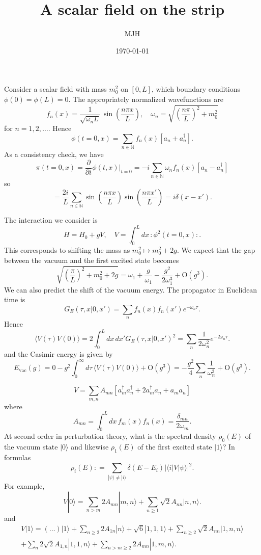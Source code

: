 \documentclass[10pt]{article}
\theoremstyle{plain}
\theoremstyle{remark}
\def\phd{{\phantom{\dagger}}}
\newcommand{\NO}[1]{{:\!#1\!:}}
\newcommand{\braket}[3]{\langle #1|#2|#3 \rangle}
\newcommand{\ket}[1]{|#1\rangle}
\newcommand{\expec}[1]{\langle #1 \rangle}
\def\ldef{\mathrel{\mathop:}=}
\def\beq{\begin{equation}}
\def\eeq{\end{equation}}
\def\mbb{\mathbb}
\def\pd{\partial}
\def\sO{\mathrm{O}}
\begin{document}
\title{A scalar field on the strip}
\author{MJH}
\date\today

\maketitle

Consider a scalar field with mass $m_0^2$ on $[0,L]$, which boundary conditions $\phi(0) = \phi(L) = 0$. The appropriately normalized wavefunctions are
\beq
f_n(x) = \frac{1}{\sqrt{ \omega_n L}} \, \sin\!\left(\frac{n\pi x}{L}\right)\!,
\quad
\omega_n = \sqrt{ \left( \frac{n \pi}{L} \right)^2 + m_0^2}
\eeq
for $n=1,2,\ldots$. Hence
\beq
\phi(t=0,x) = \sum_{n \in \mbb{N}} f_n(x) \left[ a_n^\phd + a_n^\dagger \right].
\eeq
As a consistency check, we have
\beq
\pi(t=0,x) = \frac{\pd}{\pd t} \phi(t,x) \Big|_{t=0} = - i  \sum_{n \in \mbb{N}} \omega_n f_n(x) \left[ a_n^\phd - a_n^\dagger \right]
\eeq
so
\beq
[\phi(0,x),\pi(0,x')] = \frac{2i}{L} \sum_{n \in \mbb{N}}  \sin\!\left(\frac{n \pi x}{L}\right)\sin\!\left(\frac{n \pi x'}{L}\right) = i \delta(x-x').
\eeq

The interaction we consider is
\beq
H = H_0 + g V,
\quad
V =  \int_0^L\!dx\, \NO{\phi^2(t=0,x)}.
\eeq
This corresponds to shifting the mass as $m_0^2 \mapsto m_0^2 + 2g$.  We expect that the gap between the vacuum and the first excited state becomes
\beq
\sqrt{ \left( \frac{\pi}{L} \right)^2 + m_0^2 + 2g} = \omega_1 + \frac{g}{\omega_1} - \frac{g^2}{2\omega_1^3} + \sO(g^3).
\eeq
We can also predict the shift of the vacuum energy. The propagator in Euclidean time is
\beq
G_E(\tau,x|0,x') = \sum_n f_n(x) f_n(x') e^{-\omega_n \tau}.
\eeq
Hence
\beq
\expec{V(\tau)V(0)} = 2 \int_0^L\!dx\, dx' G_E(\tau,x|0,x')^2 = \sum_{n} \frac{1}{2\omega_n^2} e^{-2\omega_n \tau}.
\eeq
and the Casimir energy is given by
\beq
E_\text{vac}(g) = 0 - g^2 \int_0^\infty\!d\tau\,  \expec{V(\tau)V(0)}  + \sO(g^3) = - \frac{g^2}{4} \sum_n \frac{1}{\omega_n^3} + \sO(g^3).
\eeq

\beq
V = \sum_{m,n} A_{mn} \left[ a_m^\dagger a_n^\dagger + 2 a_m^\dagger a_n^\phd + a_m^\phd a_n^\phd \right]
\eeq
where
\[
A_{mn} =  \int_0^L\!dx\, f_m(x) f_n(x) = \frac{\delta_{mn}}{2\omega_m}.
\]
At second order in perturbation theory, what is the spectral density $\rho_0(E)$ of the vacuum state $\ket{0}$ and likewise $\rho_1(E)$ of the first excited state $\ket{1}$?
In formulas 
\beq
\rho_i(E) \ldef \sum_{\ket{\psi} \neq \ket{i}} \delta(E-E_i) |\braket{i}{V}{\psi}|^2.
\eeq
For example,
\beq
V\ket{0} = \sum_{n>m} 2 A_{mn} \ket{m,n} + \sum_{n \geq 1} \sqrt{2} A_{nn} \ket{n,n}.
\eeq
and
\begin{multline}
V\ket{1} = (\ldots) \ket{1} + \sum_{n \geq 2 } 2 A_{1n} \ket{n} + \sqrt{6} \ket{1,1,1} + \sum_{n \geq 2} \sqrt{2} A_{nn} \ket{1,n,n} \\ + \sum_n 2\sqrt{2} A_{1,n} \ket{1,1,n} + \sum_{n > m \geq 2} 2 A_{mn} \ket{1,m,n}.
\end{multline}
\end{document}
